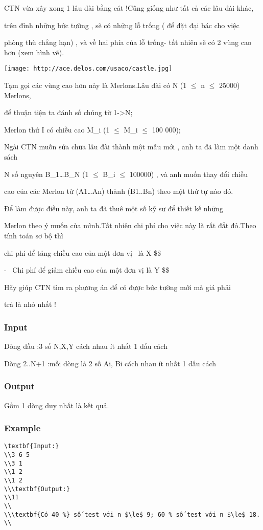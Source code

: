 



   CTN vừa xây xong 1 lâu đài bằng cát !Cũng giống như tất cả các lâu đài khác,  

   trên đỉnh những bức tường , sẽ có những lỗ trống ( để đặt đại bác cho việc  

   phòng thù chẳng hạn) , và về hai phía của lỗ trống- tất nhiên sẽ có 2 vùng cao hơn (xem hình vẽ).  


\texttt{[image: http://ace.delos.com/usaco/castle.jpg]}

   Tạm gọi các vùng cao hơn này là Merlons.Lâu đài có N (1 $\le$ n $\le$ 25000) Merlons,  

   để thuận tiện ta đánh số chúng từ 1->N;  

   Merlon thứ I có chiều cao M\_i (1 $\le$ M\_i $\le$ 100 000);  

   Ngài CTN muốn sửa chữa lâu đài thành một mẫu mới , anh ta đã làm một danh sách  

   N số nguyên B\_1…B\_N (1 $\le$ B\_i $\le$ 100000) , và anh muốn thay đổi chiều  

   cao của các Merlon từ (A1…An) thành (B1..Bn) theo một thứ tự nào đó.  



   Để làm được điều này, anh ta đã thuê một số kỹ sư để thiết kế những  

   Merlon theo ý muốn của mình.Tất nhiên chi phí cho việc này là rất đắt đỏ.Theo tính toán sơ bộ thì  

   chi phí để tăng chiều cao của một đơn vị  là X \$\$  

   -  Chi phí để giảm chiều cao của một đơn vị là Y \$\$  

   Hãy giúp CTN tìm ra phương án để có được bức tường mới mà giá phải  

   trả là nhỏ nhất !  

\subsubsection{   Input  }

   Dòng đầu :3 số N,X,Y cách nhau ít nhất 1 dấu cách  

   Dòng 2..N+1 :mỗi dòng là 2 số Ai, Bi cách nhau ít nhất 1 dấu cách  

\subsubsection{   Output  }

   Gồm 1 dòng duy nhất là kết quả.  

\subsubsection{   Example  }
\begin{verbatim}
\textbf{Input:}
\\3 6 5
\\3 1
\\1 2
\\1 2
\\\textbf{Output:}
\\11
\\
\\\textbf{Có 40 %} số test với n $\le$ 9; 60 % số test với n $\le$ 18.
\\\end{verbatim}
